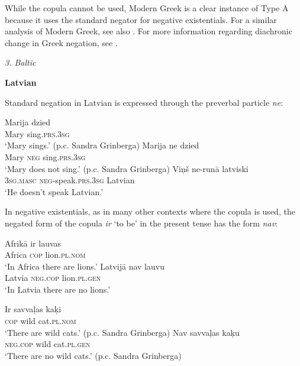 ﻿\documentclass[output=paper]{langsci/langscibook}
\begin{document}
\begin{unindented}
While the copula cannot be used, Modern Greek is a clear instance of Type A
because it uses the standard negator for negative existentials. For a
similar analysis of Modern Greek, see also
\citet[115--116]{Veselinova2013}.  For more information regarding
diachronic change in Greek negation, see \citet{KiparskyCondoravdi2006-ieur}. 

\textit{3. Baltic}

\textbf{Latvian}

Standard negation in Latvian is expressed through the preverbal particle \textit{ne}: 
%
\begin{exe}\ex \gll Marija dzied \\
Mary sing.\textsc{prs.3sg} \\
    \glt `Mary sings.' (p.c. Sandra Grinberga)
\ex \gll Marija   ne   dzied \\
Mary \textsc{neg} sing.\textsc{prs.3sg} \\
    \glt `Mary does not sing.' (p.c. Sandra Grinberga)
\ex \gll Viņš ne-runā latviski \\
\textsc{3sg}.\textsc{masc} \textsc{neg}-speak.\textsc{prs.3sg} Latvian \\
    \glt `He doesn't speak Latvian.' \citep[164]{Mathiassen1997}
    \end{exe}

In negative existentials, as in many other contexts where the copula is used, the negated form of the copula \textit{ir} `to be' in the present tense has the form \textit{nav}: 
%
\begin{exe}\ex \gll Afrikā ir lauvas \\
Africa \textsc{cop} lion.\textsc{pl.nom} \\
    \glt `In Africa there are lions.' \citep[164]{Mathiassen1997}
\ex \gll Latvijā nav lauvu \\
Latvia \textsc{neg.cop} lion.\textsc{pl.gen} \\
    \glt `In Latvia there are no lions.' \citep[164]{Mathiassen1997}
\ex\begin{xlist}
\ex \gll Ir savvaļas kaķi \\
\textsc{cop} wild cat.\textsc{pl.nom} \\
    \glt `There are wild cats.' (p.c. Sandra Grinberga)
\ex\gll Nav savvaļas kaķu\\
\textsc{neg}.\textsc{cop} wild cat.\textsc{pl.gen}\\
\glt `There are no wild cats.' (p.c. Sandra Grinberga)
    \end{xlist}\end{exe}


\end{unindented}
\end{document}
